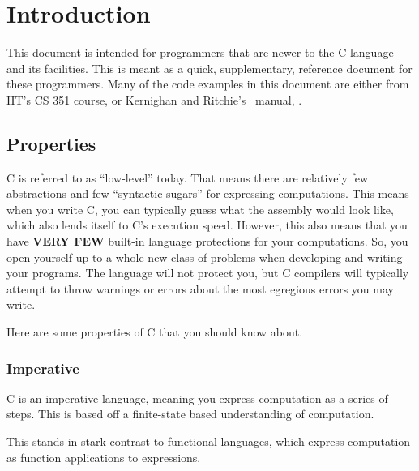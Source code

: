 \section{Introduction}\label{sec:Intro}
This document is intended for programmers that are newer to the C language and its facilities.
This is meant as a quick, supplementary, reference document for these programmers.
Many of the code examples in this document are either from IIT's CS 351 course, or Kernighan and Ritchie's~\cite{KernighanRitchieCProg} manual, .

\subsection{Properties}\label{subsec:Properties}
C is referred to as ``low-level'' today.
That means there are relatively few abstractions and few ``syntactic sugars'' for expressing computations.
This means when you write C, you can typically guess what the assembly would look like, which also lends itself to C's execution speed.
However, this also means that you have \textbf{VERY FEW} built-in language protections for your computations.
So, you open yourself up to a whole new class of problems when developing and writing your programs.
The language will not protect you, but C compilers will typically attempt to throw warnings or errors about the most egregious errors you may write.

Here are some properties of C that you should know about.

\subsubsection{Imperative}\label{subsubsec:Imperative}
C is an imperative language, meaning you express computation as a series of steps.
This is based off a finite-state based understanding of computation.

This stands in stark contrast to functional languages, which express computation as function applications to expressions.


